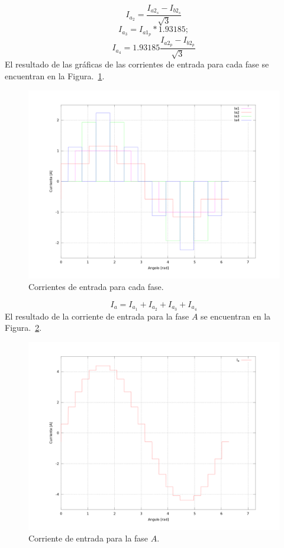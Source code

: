 \documentclass[12pt,graphicx,caption,rotating]{article}
\begin{document}
\begin{equation}
 I_{a_2}=\frac{I_{a2_s}-I_{b2_s}}{\sqrt{3}}
 \label{ecu20}
\end{equation}
\begin{equation}
 I_{a_3}=I_{a1_p}*1.93185;
 \label{ecu21}
\end{equation}
\begin{equation}
 I_{a_4}=1.93185\frac{I_{a2_p}-I_{b2_p}}{\sqrt{3}}
 \label{ecu22}
\end{equation}
\noindent
El resultado de las gráficas de las corrientes de entrada para cada fase se encuentran en la Figura.~\ref{fig8}.
\begin{figure}[H]
	\centering
		\includegraphics[scale=0.3]{corr_sal.png}
	\caption{Corrientes de entrada para cada fase.}
	\label{fig8}
\end{figure}
\begin{equation}
 I_{a} = I_{a_1} + I_{a_2} + I_{a_3} + I_{a_4}
 \label{ecu23}
\end{equation}
\noindent
El resultado de la corriente de entrada para la fase $A$ se encuentran en la Figura.~\ref{fig9}.
\begin{figure}[H]
	\centering
		\includegraphics[scale=0.4]{corr_sal_f.png}
	\caption{Corriente de entrada para la fase $A$.}
	\label{fig9}
\end{figure}
\end{document}
